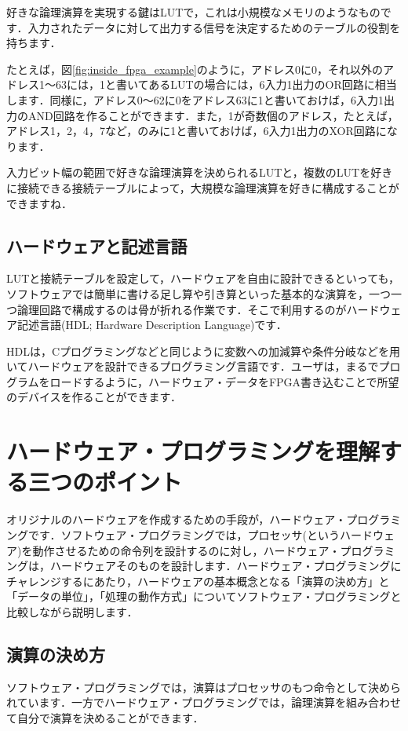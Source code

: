 \documentclass[a4paper,dvipdfmx]{jsarticle}
\begin{document}
好きな論理演算を実現する鍵はLUTで，これは小規模なメモリのようなものです．入力されたデータに対して出力する信号を決定するためのテーブルの役割を持ちます．

たとえば，図\ref{fig:inside_fpga_example}のように，アドレス0に0，それ以外のアドレス1〜63には，1と書いてあるLUTの場合には，6入力1出力のOR回路に相当します．同様に，アドレス0〜62に0をアドレス63に1と書いておけば，6入力1出力のAND回路を作ることができます．また，1が奇数個のアドレス，たとえば，アドレス1，2，4，7など，のみに1と書いておけば，6入力1出力のXOR回路になります．

入力ビット幅の範囲で好きな論理演算を決められるLUTと，複数のLUTを好きに接続できる接続テーブルによって，大規模な論理演算を好きに構成することができますね．

\subsection{ハードウェアと記述言語}

LUTと接続テーブルを設定して，ハードウェアを自由に設計できるといっても，ソフトウェアでは簡単に書ける足し算や引き算といった基本的な演算を，一つ一つ論理回路で構成するのは骨が折れる作業です．そこで利用するのがハードウェア記述言語(HDL; Hardware Description Language)です．

HDLは，Cプログラミングなどと同じように変数への加減算や条件分岐などを用いてハードウェアを設計できるプログラミング言語です．ユーザは，まるでプログラムをロードするように，ハードウェア・データをFPGA書き込むことで所望のデバイスを作ることができます．

\section{ハードウェア・プログラミングを理解する三つのポイント}

オリジナルのハードウェアを作成するための手段が，ハードウェア・プログラミングです．ソフトウェア・プログラミングでは，プロセッサ(というハードウェア)を動作させるための命令列を設計するのに対し，ハードウェア・プログラミングは，ハードウェアそのものを設計します．ハードウェア・プログラミングにチャレンジするにあたり，ハードウェアの基本概念となる「演算の決め方」と「データの単位」，「処理の動作方式」についてソフトウェア・プログラミングと比較しながら説明します．

\subsection{演算の決め方}
ソフトウェア・プログラミングでは，演算はプロセッサのもつ命令として決められています．一方でハードウェア・プログラミングでは，論理演算を組み合わせて自分で演算を決めることができます．
\end{document}
